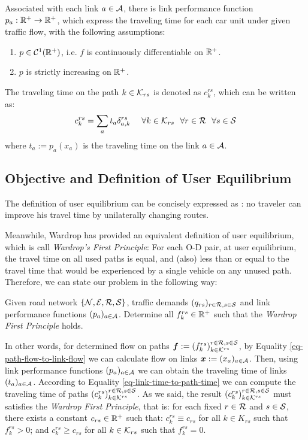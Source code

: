 \documentclass{article}
\begin{document}
Associated with each link $ a \in \mathcal{A} $, there is link performance function $ p_a : \mathbb{R}^+ \rightarrow \mathbb{R}^+ $, which express the traveling time for each car unit under given traffic flow, with the following assumptions:
\begin{enumerate}
    \item $ p \in \mathcal{C}^1 (\mathbb{R}^+) $, i.e. $ f $ is continuously differentiable on $ \mathbb{R}^+ $.
    \item $ p $ is strictly increasing on $ \mathbb{R}^+ $.
\end{enumerate}
The traveling time on the path $ k \in \mathcal{K}_{rs} $ is denoted as $ c_k^{rs} $, which can be written as: 
\begin{equation} \label{eq-link-time-to-path-time}
    c_k^{rs} = \sum_a t_a \delta_{a, k}^{rs} ~~~~ \forall k \in \mathcal{K}_{rs} ~~ \forall r \in \mathcal{R} ~~ \forall s \in \mathcal{S}
\end{equation}
where $ t_a := p_a (x_a) $ is the traveling time on the link $ a \in \mathcal{A} $.

\subsection{Objective and Definition of User Equilibrium}

The definition of user equilibrium can be concisely expressed as \cite{Shef85}: no traveler can improve his travel time by unilaterally changing routes.

Meanwhile, Wardrop \cite{wardrop1952road} has provided an equivalent definition of user equilibrium, which is call \textit{Wardrop's First Principle}: For each O-D pair, at user equilibrium, the travel time on all used paths is equal, and (also) less than or equal to the travel time that would be experienced by a single vehicle on any unused path. Therefore, we can state our problem in the following way:

\begin{prob} \label{prob-wardrop}
    Given road network $ \{ \mathcal{N}, \mathcal{E}, \mathcal{R}, \mathcal{S} \} $, traffic demands $ (q_{rs})_{r \in \mathcal{R}, s \in \mathcal{S}} $ and link performance functions $ (p_a)_{a \in \mathcal{A}} $. Determine all $ f_k^{rs} \in \mathbb{R}^+ $ such that the \textit{Wardrop First Principle} holds.
\end{prob}

In other words, for determined flow on paths $ \boldsymbol{f} := \left( f_k^{rs} \right)_{k \in \mathcal{K}^{rs}}^{r \in \mathcal{R}, s \in \mathcal{S}} $, by Equality \ref{eq-path-flow-to-link-flow} we can calculate flow on links $ \boldsymbol{x} := (x_a)_{a \in \mathcal{A}} $. Then, using link performance functions $ (p_a)_{a \in \mathcal{A}} $ we can obtain the traveling time of links $ (t_a)_{a \in \mathcal{A}} $. According to Equality \ref{eq-link-time-to-path-time} we can compute the traveling time of paths $ \left( c_k^{rs} \right)_{k \in \mathcal{K}^{rs}}^{r \in \mathcal{R}, s \in \mathcal{S}} $. As we said, the result $ \left( c_k^{rs} \right)_{k \in \mathcal{K}^{rs}}^{r \in \mathcal{R}, s \in \mathcal{S}} $ must satisfies the \textit{Wardrop First Principle}, that is: for each fixed $ r \in \mathcal{R} $ and $ s \in \mathcal{S} $, there exists a constant $ c_{rs} \in \mathbb{R}^+ $ such that: $ c_k^{rs} \equiv c_{rs} $ for all $ k \in K_{rs} $ such that $ f_k^{rs} > 0 $; and $ c_k^{rs} \ge c_{rs} $ for all $ k \in \mathcal{K}_{rs} $ such that $ f_k^{rs} = 0 $. 
\end{document}
